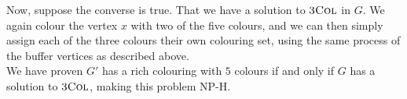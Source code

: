 \documentclass{article}
\begin{document}
\begin{solution}
\begin{enumerate}[label = (\alph*)]
Now, suppose the converse is true. That we have a solution to $\mathsf{\textsc{3Col}}$ in $G$. We again colour the vertex $x$ with two of the five colours, and we can then simply assign each of the three colours their own colouring set, using the same process of the buffer vertices as described above.\\

We have proven $G'$ has a rich colouring with $5$ colours if and only if $G$ has a solution to $\mathsf{\textsc{3Col}}$, making this problem NP-H.

\end{enumerate}


\end{solution}
\end{document}
